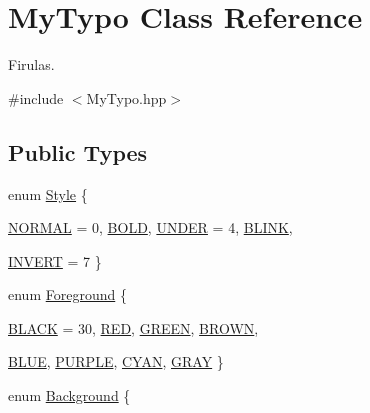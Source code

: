 \hypertarget{classMyTypo}{
\section{MyTypo Class Reference}
\label{classMyTypo}
}


Firulas.  




{\ttfamily \#include $<$MyTypo.hpp$>$}

\subsection*{Public Types}
\begin{DoxyCompactItemize}
\item 
enum \hyperlink{classMyTypo_a8def2c649b389845fc9ef0425d6ba3f3}{Style} \{ \par
\hyperlink{classMyTypo_a8def2c649b389845fc9ef0425d6ba3f3a77b0bcc2d2ad397aaf217b9925311286}{NORMAL} =  0, 
\hyperlink{classMyTypo_a8def2c649b389845fc9ef0425d6ba3f3a7b77c3671053b7cecb4f5f62d5f3dacd}{BOLD}, 
\hyperlink{classMyTypo_a8def2c649b389845fc9ef0425d6ba3f3a092275401d9e91f117091f7f830c4537}{UNDER} =  4, 
\hyperlink{classMyTypo_a8def2c649b389845fc9ef0425d6ba3f3aeba436648705fd91802eca94dd774bef}{BLINK}, 
\par
\hyperlink{classMyTypo_a8def2c649b389845fc9ef0425d6ba3f3a072b22b51d23b6ba5507658851b1508a}{INVERT} =  7
 \}
\item 
enum \hyperlink{classMyTypo_a82023ae74e9c64ec7b6e57d54df708ea}{Foreground} \{ \par
\hyperlink{classMyTypo_a82023ae74e9c64ec7b6e57d54df708eaa5d485cc852fd8925db5f58724949ed7d}{BLACK} =  30, 
\hyperlink{classMyTypo_a82023ae74e9c64ec7b6e57d54df708eaae9a6714a38c1570a628c92d992b8886a}{RED}, 
\hyperlink{classMyTypo_a82023ae74e9c64ec7b6e57d54df708eaac0090bdb54450325945e1eec5f3240df}{GREEN}, 
\hyperlink{classMyTypo_a82023ae74e9c64ec7b6e57d54df708eaa3980d41699961553b6365178968e1235}{BROWN}, 
\par
\hyperlink{classMyTypo_a82023ae74e9c64ec7b6e57d54df708eaae3d9ddbcc3cceb11912943b7647b3842}{BLUE}, 
\hyperlink{classMyTypo_a82023ae74e9c64ec7b6e57d54df708eaa49a268a91b8ed1b28ea8518bed685029}{PURPLE}, 
\hyperlink{classMyTypo_a82023ae74e9c64ec7b6e57d54df708eaa20a754710244898038b406234e73682e}{CYAN}, 
\hyperlink{classMyTypo_a82023ae74e9c64ec7b6e57d54df708eaaa48d0f298f2b7be62cd7dc84d6b7a999}{GRAY}
 \}
\item 
enum \hyperlink{classMyTypo_ac6643b465e94f6ecb7fb650c4b3531e8}{Background} \{ \par

\end{DoxyCompactItemize}
